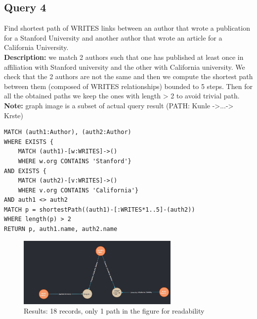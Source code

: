 \documentclass{Configuration_Files/PoliMi3i_thesis}
\begin{document}
\subsection{Query 4}
Find shortest path of WRITES links between an author that wrote a publication for a Stanford University and another author
that wrote an article for a California University.\\
\textbf{Description:} we match 2 authors such that one has published at least once in affiliation with Stanford university and the other with California university.
We check that the 2 authors are not the same and then we compute the shortest path between them (composed of WRITES relationships) bounded to 5 steps.
Then for all the obtained paths we keep the ones with length > 2 to avoid trivial path.\\
\textbf{Note:} graph image is a subset of actual query result (PATH: Kunle ->...-> Krste)
\begin{lstlisting}[language=cypher, label=lst:cypher-example]
MATCH (auth1:Author), (auth2:Author)
WHERE EXISTS {
    MATCH (auth1)-[w:WRITES]->()
    WHERE w.org CONTAINS 'Stanford'}
AND EXISTS {
    MATCH (auth2)-[v:WRITES]->()
    WHERE v.org CONTAINS 'California'}
AND auth1 <> auth2
MATCH p = shortestPath((auth1)-[:WRITES*1..5]-(auth2))
WHERE length(p) > 2
RETURN p, auth1.name, auth2.name
\end{lstlisting}
\begin{figure}[H]
\centering
\includegraphics[width=0.7\textwidth]{query/query4.jpeg}
\caption{Results: 18 records, only 1 path in the figure for readability}
\label{fig:query4}
\end{figure}
\end{document}
